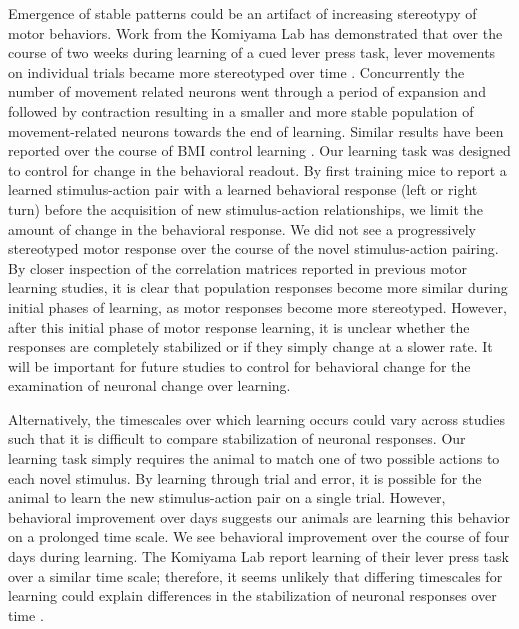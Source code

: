Emergence of stable patterns could be an artifact of increasing stereotypy of motor behaviors. Work from the Komiyama Lab has demonstrated that over the course of two weeks during learning of a cued lever press task, lever movements on individual trials became more stereotyped over time \citep{Peters2014}.  Concurrently the number of movement related neurons went through a period of expansion and followed by contraction resulting in a smaller and more stable population of movement-related neurons towards the end of learning. Similar results have been reported over the course of BMI control learning \citep{Ganguly2009}. Our learning task was designed to control for change in the behavioral readout. By first training mice to report a learned stimulus-action pair with a learned behavioral response (left or right turn) before the acquisition of new stimulus-action relationships, we limit the amount of change in the behavioral response. We did not see a progressively stereotyped motor response over the course of the novel stimulus-action pairing. By closer inspection of the correlation matrices reported in previous motor learning studies, it is clear that population responses become more similar during initial phases of learning, as motor responses become more stereotyped. However, after this initial phase of motor response learning, it is unclear whether the responses are completely stabilized or if they simply change at a slower rate. It will be important for future studies to control for behavioral change for the examination of neuronal change over learning.

\bigskip

Alternatively, the timescales over which learning occurs could vary across studies such that it is difficult to compare stabilization of neuronal responses. Our learning task simply requires the animal to match one of two possible actions to each novel stimulus. By learning through trial and error, it is possible for the animal to learn the new stimulus-action pair on a single trial. However, behavioral improvement over days suggests our animals are learning this behavior on a prolonged time scale. We see behavioral improvement over the course of four days during learning. The Komiyama Lab report learning of their lever press task over a similar time scale; therefore, it seems unlikely that differing timescales for learning could explain differences in the stabilization of neuronal responses over time \citep{Peters2014}.

